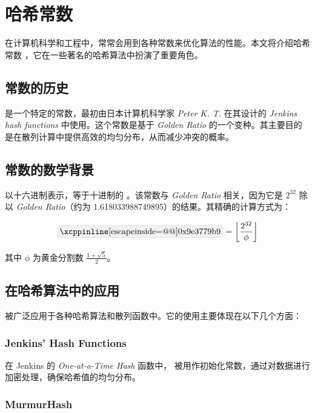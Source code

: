 \chapter{哈希常数}

在计算机科学和工程中，常常会用到各种常数来优化算法的性能。本文将介绍哈希常数 ，它在一些著名的哈希算法中扮演了重要角色。

\section{常数的历史}

 是一个特定的常数，最初由日本计算机科学家 \textit{Peter K. T.} 在其设计的 \textit{Jenkins hash functions} 中使用。这个常数是基于 \textit{Golden Ratio} 的一个变种。其主要目的是在散列计算中提供高效的均匀分布，从而减少冲突的概率。

\section{常数的数学背景}

 以十六进制表示，等于十进制的 。该常数与 \textit{Golden Ratio}
相关，因为它是 {$2^{32}$} 除以 \textit{Golden Ratio}（约为 1.618033988749895）的结果。其精确的计算方式为：

\[
\cppinline{0x9e3779b9} = \left\lfloor \frac{2^{32}}{\phi} \right\rfloor
\]

其中 \(\phi\) 为黄金分割数 \(\frac{1 + \sqrt{5}}{2}\)。

\section{在哈希算法中的应用}

 被广泛应用于各种哈希算法和散列函数中。它的使用主要体现在以下几个方面：

\subsection{Jenkins' Hash Functions}

在 Jenkins 的 \textit{One-at-a-Time Hash} 函数中， 被用作初始化常数，通过对数据进行加密处理，确保哈希值的均匀分布。

\subsection{MurmurHash}


